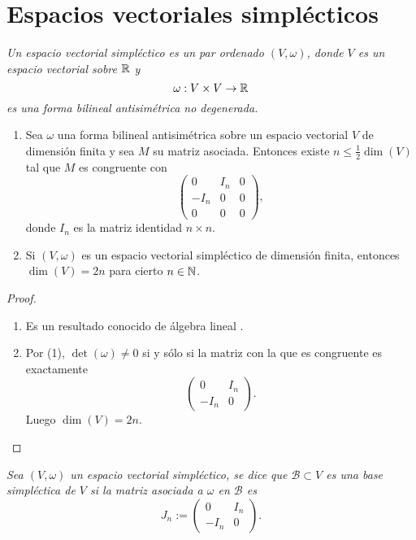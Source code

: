 
\section{Espacios vectoriales simplécticos}\label{2}
\begin{defn}
  \em
Un \emph{espacio vectorial simpléctico} es un par ordenado $(V,\omega)$, donde $V$ es un espacio vectorial sobre $\mathbb{R}$ y 
	\[
	  \omega: V \times V \rightarrow \mathbb{R}
	\]
	es una forma bilineal antisimétrica no degenerada.
\end{defn}
\begin{prop}\leavevmode
  \begin{enumerate}
    \item Sea $\omega$ una forma bilineal antisimétrica sobre un espacio vectorial $V$ de dimensión finita y sea $M$ su matriz asociada. Entonces existe $n \leq \frac{1}{2}\dim(V)$ tal que $M$ es congruente con
      \[
	\left(
	\begin{array}{ccc}
	  0 & I_n & 0 \\
	  -I_n & 0 & 0 \\
	  0 & 0 & 0
	\end{array}\right),
      \]
      donde $I_n$ es la matriz identidad $n \times n$.
    \item Si $(V,\omega)$ es un espacio vectorial simpléctico de dimensión finita, entonces $\dim(V)=2n$ para cierto $n \in \mathbb{N}$.
  \end{enumerate}
\end{prop}
\begin{proof}\leavevmode
  \begin{enumerate}
    \item Es un resultado conocido de álgebra lineal \cite{algebra}.
    \item Por (1), $\det(\omega) \neq 0$ si y sólo si la matriz con la que es congruente es exactamente 
      \[
\left(
	\begin{array}{cc}
	  0 & I_n  \\
	  -I_n & 0 
	\end{array}\right).
      \]
      Luego $\dim(V)=2n$.
 \end{enumerate}
\end{proof}
\begin{defn}
  \em
  Sea $(V,\omega)$ un espacio vectorial simpléctico, se dice que $\mathcal{B}\subset V$ es una \emph{base simpléctica} de $V$ si la matriz asociada a $\omega$ en $\mathcal{B}$ es
\[
  J_n :=
\left(
	\begin{array}{cc}
	  0 & I_n  \\
	  -I_n & 0 
	\end{array}\right).
      \]
\end{defn}
